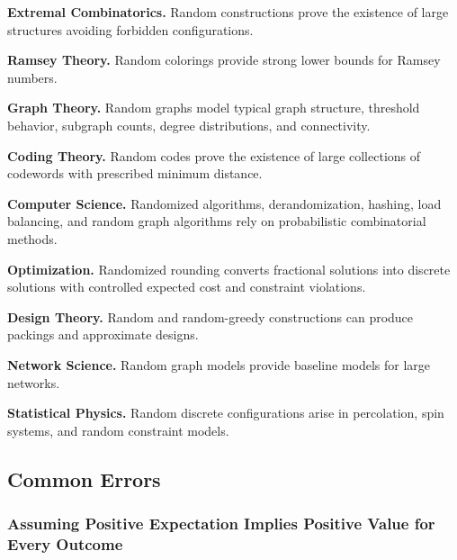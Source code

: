 \begin{applicationbox}

\textbf{Extremal Combinatorics.}
Random constructions prove the existence of large structures avoiding
forbidden configurations.

\medskip

\textbf{Ramsey Theory.}
Random colorings provide strong lower bounds for Ramsey numbers.

\medskip

\textbf{Graph Theory.}
Random graphs model typical graph structure, threshold behavior,
subgraph counts, degree distributions, and connectivity.

\medskip

\textbf{Coding Theory.}
Random codes prove the existence of large collections of codewords with
prescribed minimum distance.

\medskip

\textbf{Computer Science.}
Randomized algorithms, derandomization, hashing, load balancing, and
random graph algorithms rely on probabilistic combinatorial methods.

\medskip

\textbf{Optimization.}
Randomized rounding converts fractional solutions into discrete
solutions with controlled expected cost and constraint violations.

\medskip

\textbf{Design Theory.}
Random and random-greedy constructions can produce packings and
approximate designs.

\medskip

\textbf{Network Science.}
Random graph models provide baseline models for large networks.

\medskip

\textbf{Statistical Physics.}
Random discrete configurations arise in percolation, spin systems, and
random constraint models.

\end{applicationbox}

\subsection{Common Errors}
\label{subsec:probabilistic-combinatorics-common-errors}

\subsubsection{Assuming Positive Expectation Implies Positive Value for Every Outcome}


